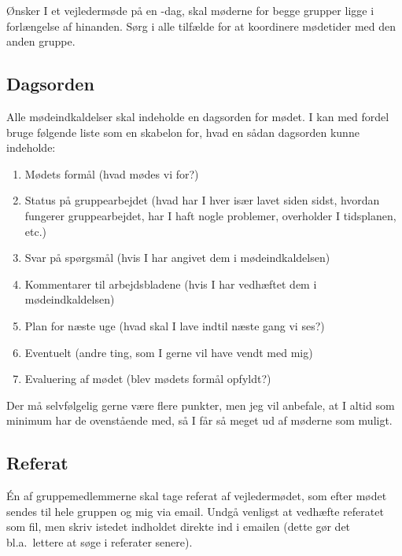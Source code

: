 Ønsker I et vejledermøde på en -dag, skal møderne for begge grupper ligge i forlængelse af hinanden.
Sørg i alle tilfælde for at koordinere mødetider med den anden gruppe.

\subsection{Dagsorden}
\label{subsec:agenda}
Alle mødeindkaldelser skal indeholde en dagsorden for mødet.
I kan med fordel bruge følgende liste som en skabelon for, hvad en sådan dagsorden kunne indeholde:
\begin{enumerate}[itemsep=0pt]
\item Mødets formål (hvad mødes vi for?)
\item Status på gruppearbejdet (hvad har I hver især lavet siden sidst, hvordan fungerer gruppearbejdet, har I haft nogle problemer, overholder I tidsplanen, etc.)
\item Svar på spørgsmål (hvis I har angivet dem i mødeindkaldelsen)
\item Kommentarer til arbejdsbladene (hvis I har vedhæftet dem i mødeindkaldelsen)
\item Plan for næste uge (hvad skal I lave indtil næste gang vi ses?)
\item Eventuelt (andre ting, som I gerne vil have vendt med mig)
\item Evaluering af mødet (blev mødets formål opfyldt?)
\end{enumerate}
Der må selvfølgelig gerne være flere punkter, men jeg vil anbefale, at I altid som minimum har de ovenstående med, så I får så meget ud af møderne som muligt.

\subsection{Referat}
\label{subsec:summary}
\'En af gruppemedlemmerne skal tage referat af vejledermødet, som efter mødet sendes til hele gruppen og mig via email.
Undgå venligst at vedhæfte referatet som fil, men skriv istedet indholdet direkte ind i emailen (dette gør det bl.a.\ lettere at søge i referater senere).
